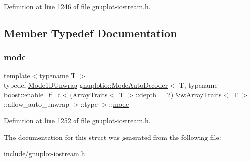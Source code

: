Definition at line 1246 of file gnuplot-\/iostream.\+h.



\subsection{Member Typedef Documentation}
\mbox{\label{structgnuplotio_1_1_mode_auto_decoder_3_01_t_00_01typename_01boost_1_1enable__if__c_3_07_array_t4ce8ac95d6c3a0ceeea993ff675b3872_a9e0be01a3f2d3ea2184dab631c3bb950}} 
\subsubsection{\texorpdfstring{mode}{mode}}
{\footnotesize\ttfamily template$<$typename T $>$ \\
typedef \hyperlink{structgnuplotio_1_1_mode1_d_unwrap}{Mode1\+D\+Unwrap} \hyperlink{structgnuplotio_1_1_mode_auto_decoder}{gnuplotio\+::\+Mode\+Auto\+Decoder}$<$ T, typename boost\+::enable\+\_\+if\+\_\+c$<$(\hyperlink{classgnuplotio_1_1_array_traits}{Array\+Traits}$<$ T $>$\+::depth==2) \&\&\hyperlink{classgnuplotio_1_1_array_traits}{Array\+Traits}$<$ T $>$\+::allow\+\_\+auto\+\_\+unwrap $>$\+::type $>$\+::\hyperlink{structgnuplotio_1_1_mode_auto_decoder_3_01_t_00_01typename_01boost_1_1enable__if__c_3_07_array_t4ce8ac95d6c3a0ceeea993ff675b3872_a9e0be01a3f2d3ea2184dab631c3bb950}{mode}}



Definition at line 1252 of file gnuplot-\/iostream.\+h.



The documentation for this struct was generated from the following file\+:\begin{DoxyCompactItemize}
\item 
include/\hyperlink{gnuplot-iostream_8h}{gnuplot-\/iostream.\+h}\end{DoxyCompactItemize}
